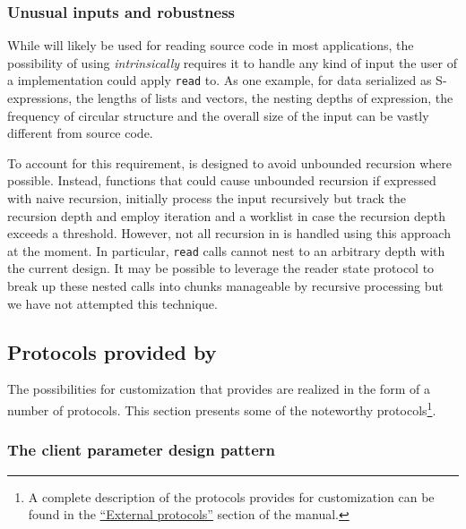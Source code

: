 \subsubsection{Unusual inputs and robustness}

While \eclector{} will likely be used for reading source code in most
applications, the possibility of using \eclector{}
\emph{intrinsically} requires it to handle any kind of input the user
of a \cl{} implementation could apply \texttt{read} to.  As one
example, for data serialized as S-expressions, the lengths of lists
and vectors, the nesting depths of expression, the frequency of
circular structure and the overall size of the input can be vastly
different from source code.

To account for this requirement, \eclector{} is designed to avoid
unbounded recursion where possible.  Instead, functions that could
cause unbounded recursion if expressed with naive recursion, initially
process the input recursively but track the recursion depth and employ
iteration and a worklist in case the recursion depth exceeds a
threshold.  However, not all recursion in \eclector{} is handled using
this approach at the moment.  In particular, \texttt{read} calls
cannot nest to an arbitrary depth with the current design.  It may be
possible to leverage the reader state protocol
 to break up these nested calls into
chunks manageable by recursive processing but we have not attempted
this technique.

\subsection{Protocols provided by \eclector{}}
\label{sec:protocols}

The possibilities for customization that \eclector{} provides are
realized in the form of a number of protocols.  This section
presents some of the noteworthy protocols\footnote{A complete
  description of the protocols \eclector{} provides for customization
  can be found in the
  \href{https://s-expressionists.github.io/Eclector/eclector.html\#External-protocols}{``External protocols''}
  section of the manual.}.

\subsubsection{The client parameter design pattern}
\label{sec:client-parameter}

